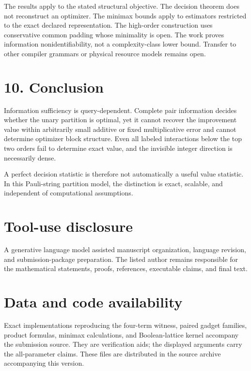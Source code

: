 \documentclass[
  11pt,
]{article}
\begin{document}
The results apply to the stated structural objective. The decision
theorem does not reconstruct an optimizer. The minimax bounds apply to
estimators restricted to the exact declared representation. The
high-order construction uses conservative common padding whose
minimality is open. The work proves information nonidentifiability, not
a complexity-class lower bound. Transfer to other compiler grammars or
physical resource models remains open.

\hypertarget{conclusion}{%
\section{10. Conclusion}\label{conclusion}}

Information sufficiency is query-dependent. Complete pair information
decides whether the unary partition is optimal, yet it cannot recover
the improvement value within arbitrarily small additive or fixed
multiplicative error and cannot determine optimizer block structure.
Even all labeled interactions below the top two orders fail to determine
exact value, and the invisible integer direction is necessarily dense.

A perfect decision statistic is therefore not automatically a useful
value statistic. In this Pauli-string partition model, the distinction
is exact, scalable, and independent of computational assumptions.

\hypertarget{tool-use-disclosure}{%
\section{Tool-use disclosure}\label{tool-use-disclosure}}

A generative language model assisted manuscript organization, language
revision, and submission-package preparation. The listed author remains
responsible for the mathematical statements, proofs, references,
executable claims, and final text.

\hypertarget{data-and-code-availability}{%
\section{Data and code availability}\label{data-and-code-availability}}

Exact implementations reproducing the four-term witness, paired gadget
families, product formulas, minimax calculations, and Boolean-lattice
kernel accompany the submission source. They are verification aids; the
displayed arguments carry the all-parameter claims. These files are
distributed in the source archive accompanying this version.
\end{document}
